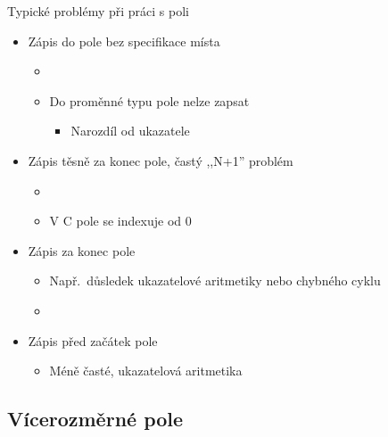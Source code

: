 \begin{frame}{Typické problémy při práci s poli}

  \begin{itemize}
    \item Zápis do pole bez specifikace místa
    \begin{itemize}
      \item {}
      \item Do proměnné typu pole nelze zapsat
      \begin{itemize}
	\item Narozdíl od ukazatele
      \end{itemize}
    \end{itemize}

    \pause

    \item Zápis těsně za konec pole, častý ,,N+1'' problém
    \begin{itemize}
      \item {}
      \item V C pole se indexuje od 0
    \end{itemize}

    \pause

    \item Zápis za konec pole
    \begin{itemize}
      \item Např.\ důsledek ukazatelové aritmetiky nebo chybného cyklu
      \item {}
    \end{itemize}

    \pause

    \item Zápis před začátek pole
    \begin{itemize}
      \item Méně časté, ukazatelová aritmetika
    \end{itemize}

  \end{itemize}

\end{frame}

\subsection*{Vícerozměrné pole}
\frame{\subsectionpage}

